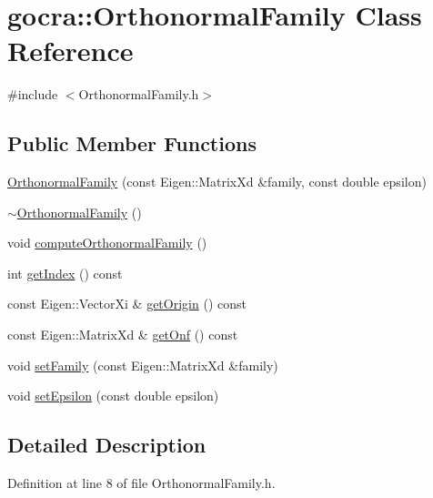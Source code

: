\hypertarget{classgocra_1_1OrthonormalFamily}{}\section{gocra\+:\+:Orthonormal\+Family Class Reference}
\label{classgocra_1_1OrthonormalFamily}


{\ttfamily \#include $<$Orthonormal\+Family.\+h$>$}

\subsection*{Public Member Functions}
\begin{DoxyCompactItemize}
\item 
\hyperlink{classgocra_1_1OrthonormalFamily_a119f335434f7695b587a40d40c5117c8}{Orthonormal\+Family} (const Eigen\+::\+Matrix\+Xd \&family, const double epsilon)
\item 
\hyperlink{classgocra_1_1OrthonormalFamily_a4c31a4a79ec5df60209cb7aa4a8e5306}{$\sim$\+Orthonormal\+Family} ()
\item 
void \hyperlink{classgocra_1_1OrthonormalFamily_a8961a7be4e0c54ebe99bd416f6de4bc3}{compute\+Orthonormal\+Family} ()
\item 
int \hyperlink{classgocra_1_1OrthonormalFamily_a1d357fcc1881e4c828802164e0396272}{get\+Index} () const
\item 
const Eigen\+::\+Vector\+Xi \& \hyperlink{classgocra_1_1OrthonormalFamily_a5b1a38bfce734095c80d824add5fa1b3}{get\+Origin} () const
\item 
const Eigen\+::\+Matrix\+Xd \& \hyperlink{classgocra_1_1OrthonormalFamily_a4b44820fa67f54c9a8c65d618ff85f38}{get\+Onf} () const
\item 
void \hyperlink{classgocra_1_1OrthonormalFamily_a503aee1056787a99c703ef5af439a9fe}{set\+Family} (const Eigen\+::\+Matrix\+Xd \&family)
\item 
void \hyperlink{classgocra_1_1OrthonormalFamily_a6a1956253f62f00929b60c848e7b35f5}{set\+Epsilon} (const double epsilon)
\end{DoxyCompactItemize}


\subsection{Detailed Description}


Definition at line 8 of file Orthonormal\+Family.\+h.



